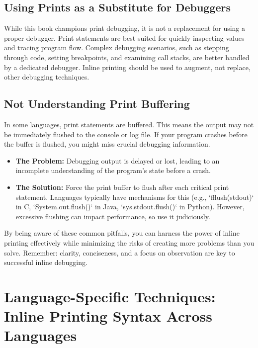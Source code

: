 \documentclass{article}
\begin{document}
{{{{\subsection*{Using Prints as a Substitute for Debuggers}

While this book champions print debugging, it is not a replacement for using a proper debugger.  Print statements are best suited for quickly inspecting values and tracing program flow. Complex debugging scenarios, such as stepping through code, setting breakpoints, and examining call stacks, are better handled by a dedicated debugger.  Inline printing should be used to augment, not replace, other debugging techniques.
\subsection*{Not Understanding Print Buffering}
In some languages, print statements are buffered. This means the output may not be immediately flushed to the console or log file. If your program crashes before the buffer is flushed, you might miss crucial debugging information.

\begin{itemize}
    \item {\bf The Problem:} Debugging output is delayed or lost, leading to an incomplete understanding of the program's state before a crash.
    \item {\bf The Solution:} Force the print buffer to flush after each critical print statement.  Languages typically have mechanisms for this (e.g., `fflush(stdout)` in C, `System.out.flush()` in Java, `sys.stdout.flush()` in Python). However, excessive flushing can impact performance, so use it judiciously.
\end{itemize}
By being aware of these common pitfalls, you can harness the power of inline printing effectively while minimizing the risks of creating more problems than you solve. Remember: clarity, conciseness, and a focus on observation are key to successful inline debugging.

\newpage

\section*{Language-Specific Techniques: Inline Printing Syntax Across Languages} %
\label{chapter-6-9-Language-Specific_Techniques__Inline_Pri}

}}}}
\end{document}
